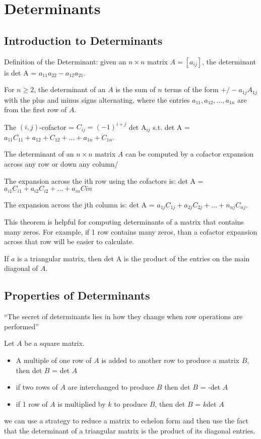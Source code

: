 \documentclass[../linalg.tex]{subfiles}
\begin{document}
\chapter{Determinants}
\section{Introduction to Determinants}
Definition of the Determinant: given an $n\times n$ matrix $A=[a_{ij}]$, the determinant is det A = $a_{11}a_{22}-a_{12}a_{21}$.

For $n\geq 2$, the determinant of an $A$ is the sum of $n$ terms of the form $+/-a_{1j}A_{1j}$ with the plus and minus signs alternating, where the entries $a_{11},a_{12},\dots, a_{1n}$ are from the first row of $A$. 

The $(i,j)$-cofactor = $C_{ij}=(-1)^{i+j}$ det A$_{ij}$ s.t. det A = $a_{11}C_{11}+a_{12}+C_{12}+\dots + a_{1n}+C_{1n}$.

\begin{theorem}
    The determinant of an $n\times n$ matrix $A$ can be computed by a cofactor expansion across any row or down any column/

    The expansion across the ith row using the cofactors is: det A = $a_{i1}C_{i1}+a_{i2}C_{i2}+\dots +a_{in}C{in}$

    The expansion across the jth column is: det A = $a_{1j}C_{1j}+a_{2j}C_{2j}+\dots + n_{nj}C_{nj}$.
\end{theorem}

This theorem is helpful for computing determinants of a matrix that contains many zeros. For example, if 1 row contains many zeros, than a cofactor expansion across that row will be easier to calculate.

\begin{theorem}
    If $a$ is a triangular matrix, then det A is the product of the entries on the main diagonal of $A$.
\end{theorem}

\section{Properties of Determinants}
``The secret of determinants lies in how they change when row operations are performed''

\begin{theorem}
    Let $A$ be a square matrix.

    \begin{itemize}
        \item A multiple of one row of $A$ is added to another row to produce a matrix $B$, then det $B$ = det $A$
        \item if two rows of $A$ are interchanged to produce $B$ then det $B$ = -det $A$
        \item if 1 row of $A$ is multiplied by $k$ to produce $B$, then det $B$ = $k$det $A$
    \end{itemize}

    we can use a strategy to reduce a matrix to echelon form and then use the fact that the determinant of a triangular matrix is the product of its diagonal entries.
\end{theorem}
\end{document}
